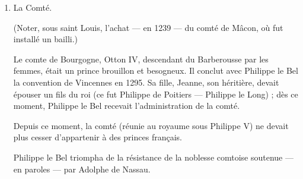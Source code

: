 \documentclass[french,twoside]{book} %
\begin{document}
\begin{enumerate}[itemsep=\baselineskip,]
\item La Comté.\par
(Noter, sous saint Louis, l’achat — en 1239 — du comté de Mâcon, où fut installé un bailli.)\par
Le comte de Bourgogne, Otton IV, descendant du Barberousse par les femmes, était un prince brouillon et besogneux. Il conclut avec Philippe le Bel la convention de Vincennes en 1295. Sa fille, Jeanne, son héritière, devait épouser un fils du roi (ce fut Philippe de Poitiers — Philippe le Long) ; dès ce moment, Philippe le Bel recevait l’administration de la comté.\par
Depuis ce moment, la comté (réunie au royaume sous Philippe V) ne devait plus cesser d’appartenir à des princes français.\par
Philippe le Bel triompha de la résistance de la noblesse comtoise soutenue — en paroles — par Adolphe de Nassau.


\end{enumerate}
\end{document}
